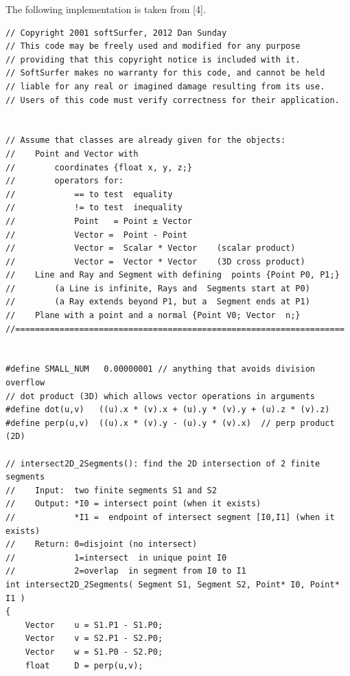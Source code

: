 \documentclass[12pt]{article}
\begin{document}
The following implementation is taken from [4].
\begin{lstlisting}
// Copyright 2001 softSurfer, 2012 Dan Sunday
// This code may be freely used and modified for any purpose
// providing that this copyright notice is included with it.
// SoftSurfer makes no warranty for this code, and cannot be held
// liable for any real or imagined damage resulting from its use.
// Users of this code must verify correctness for their application.
 

// Assume that classes are already given for the objects:
//    Point and Vector with
//        coordinates {float x, y, z;}
//        operators for:
//            == to test  equality
//            != to test  inequality
//            Point   = Point ± Vector
//            Vector =  Point - Point
//            Vector =  Scalar * Vector    (scalar product)
//            Vector =  Vector * Vector    (3D cross product)
//    Line and Ray and Segment with defining  points {Point P0, P1;}
//        (a Line is infinite, Rays and  Segments start at P0)
//        (a Ray extends beyond P1, but a  Segment ends at P1)
//    Plane with a point and a normal {Point V0; Vector  n;}
//===================================================================
 

#define SMALL_NUM   0.00000001 // anything that avoids division overflow
// dot product (3D) which allows vector operations in arguments
#define dot(u,v)   ((u).x * (v).x + (u).y * (v).y + (u).z * (v).z)
#define perp(u,v)  ((u).x * (v).y - (u).y * (v).x)  // perp product  (2D)

// intersect2D_2Segments(): find the 2D intersection of 2 finite segments
//    Input:  two finite segments S1 and S2
//    Output: *I0 = intersect point (when it exists)
//            *I1 =  endpoint of intersect segment [I0,I1] (when it exists)
//    Return: 0=disjoint (no intersect)
//            1=intersect  in unique point I0
//            2=overlap  in segment from I0 to I1
int intersect2D_2Segments( Segment S1, Segment S2, Point* I0, Point* I1 )
{
    Vector    u = S1.P1 - S1.P0;
    Vector    v = S2.P1 - S2.P0;
    Vector    w = S1.P0 - S2.P0;
    float     D = perp(u,v);


\end{lstlisting}
\end{document}
